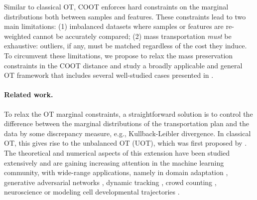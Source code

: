 Similar to classical OT, COOT enforces hard constraints on the marginal distributions
both between samples and features. These constraints lead to two main limitations:
(1) imbalanced datasets where samples or features are re-weighted
cannot be accurately compared; (2) mass transportation \emph{must} be exhaustive:
outliers, if any, must be matched regardless of the cost they induce.
To circumvent these limitations, we propose to relax the mass preservation constraints
in the COOT distance and study a broadly applicable and general OT framework
that includes several well-studied cases presented in .

\paragraph{Related work.}
To relax the OT marginal constraints, a straightforward solution is to control
the difference between the marginal distributions of the transportation plan
and the data by some discrepancy measure, e.g., Kullback-Leibler divergence.
In classical OT, this gives rise to the unbalanced OT (UOT),
which was first proposed by \citet{Benamou03}.
The theoretical and numerical aspects of this extension
have been studied extensively \citep{Liero18,Chizat18b,Chizat18a,Khiem20}
and are gaining increasing attention in the machine
learning community, with wide-range applications, namely in
domain adaptation \citep{Fatras21}, generative adversarial networks
\citep{Balaji20, Yang19}, dynamic tracking \citep{Lee19}, crowd counting \citep{Ma21},
neuroscience \citep{janati2019group, bazeille2019} or
modeling cell developmental trajectories \citep{Schiebinger19}.

